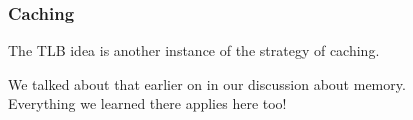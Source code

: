 \begin{frame}
\frametitle{Caching}

The TLB idea is another instance of the strategy of caching. 

We talked about that earlier on in our discussion about memory.\\
\quad Everything we learned there applies here too!

\end{frame}



